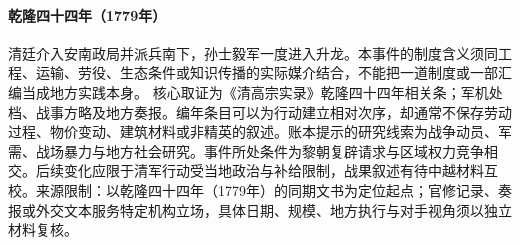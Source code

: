 \hypertarget{civic:EQ-1779-VIETNAM-INTERVENTION}{}\paragraph{乾隆四十四年（1779年）}清廷介入安南政局并派兵南下，孙士毅军一度进入升龙。本事件的制度含义须同工程、运输、劳役、生态条件或知识传播的实际媒介结合，不能把一道制度或一部汇编当成地方实践本身。 核心取证为《清高宗实录》乾隆四十四年相关条；军机处档、战事方略及地方奏报。编年条目可以为行动建立相对次序，却通常不保存劳动过程、物价变动、建筑材料或非精英的叙述。账本提示的研究线索为战争动员、军需、战场暴力与地方社会研究。事件所处条件为黎朝复辟请求与区域权力竞争相交。后续变化应限于清军行动受当地政治与补给限制，战果叙述有待中越材料互校。来源限制：以乾隆四十四年（1779年）的同期文书为定位起点；官修记录、奏报或外交文本服务特定机构立场，具体日期、规模、地方执行与对手视角须以独立材料复核。
